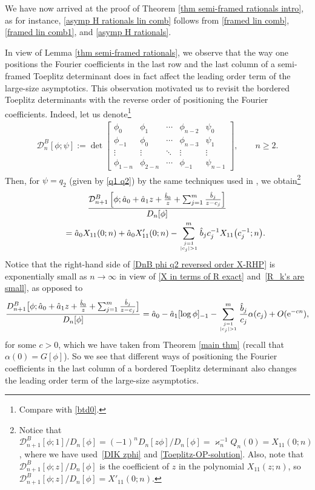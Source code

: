 \documentclass[10pt,a4paper]{amsart}
\numberwithin{equation}{section}
\newcommand{\al}{\alpha}
\begin{document}
We have now arrived at the proof of Theorem \ref{thm semi-framed rationals intro}, as for instance, \eqref{asymp H rationals lin comb} follows from \eqref{framed lin comb}, \eqref{framed lin comb1}, and \eqref{asymp H rationals}.
		
\begin{Remark}
In view of Lemma \ref{thm semi-framed rationals}, we observe that the way one positions the Fourier coefficients in the last row and the last column of a semi-framed Toeplitz determinant does in fact affect the leading order term of the large-size asymptotics. This observation motivated us to revisit the bordered Toeplitz determinants with the reverse order of positioning the Fourier coefficients. Indeed, let us denote\footnote{Compare with \eqref{btd0}.}
			\begin{gather*}%
				\mathcal{D}^{B}_{n}[\phi; \psi] := \det \begin{bmatrix}
					\phi_0& \phi_1 & \cdots & \phi_{n-2} & \psi_{0} \\
					\phi_{-1}& \phi_0 & \cdots & \phi_{n-3}&\psi_{1} \\
					\vdots & \vdots & \ddots & \vdots & \vdots\\
					\phi_{1-n} & \phi_{2-n} & \cdots & \phi_{-1}& \psi_{n-1}
				\end{bmatrix}, \qquad n \geq 2.
			\end{gather*}
			Then, for $\psi=q_2$ (given by \eqref{q1 q2}) by the same techniques used in \cite{BEGIL}, we obtain\footnote{Notice that $\mathcal{D}^{B}_{n+1}[\phi; 1]/D_n[\phi]=(-1)^{n}D_{n}[z\phi]/D_n[\phi] = \varkappa^{-1}_{n} Q_n(0) = X_{11}(0;n)$, where we have used~\eqref{DIK zphi} and \eqref{Toeplitz-OP-solution}. Also, note that $\mathcal{D}^{B}_{n+1}[\phi; z]/D_n[\phi]$ is the coefficient of $z$ in the polynomial $X_{11}(z;n)$, so $\mathcal{D}^{B}_{n+1}[\phi; z]/D_n[\phi] = X'_{11}(0;n)$.}
			\begin{gather}
				\frac{\mathcal{D}^{B}_{n+1}\left[\phi; \hat{a}_0+\hat{a}_1z+\tfrac{\hat{b}_0}{z}+	\sum_{j=1}^m \tfrac{\hat{b}_j}{z-c_j}\right]}{D_n[\phi]}\nonumber\\
\qquad = \hat{a}_0 X_{11}(0;n) + \hat{a}_0 X'_{11}(0;n) - \sum_{j=1 \atop |c_j|>1}^{m} \hat{b}_j c^{-1}_j X_{11}\big(c^{-1}_j;n\big).\label{DnB phi q2 reversed order X-RHP}
			\end{gather}
			Notice that the right-hand side of \eqref{DnB phi q2 reversed order X-RHP} is exponentially small as $n \to \infty$ in view of \eqref{X in terms of R exact} and~\eqref{R_k's are small}, as opposed to
			\begin{gather*}
				\frac{D^{B}_{n+1}\big[\phi; \hat{a}_0+\hat{a}_1z+\tfrac{\hat{b}_0}{z}+\sum_{j=1}^m \tfrac{\hat{b}_j}{z-c_j}\big]}{D_n[\phi]} = 			
				\hat{a}_0-\hat{a}_1[\log \phi]_{-1} -
				 \sum^{m}_{j=1 \atop |c_j|>1 } \frac{\hat{b}_j}{c_j} \al(c_j) + O({\rm e}^{-cn}),
			\end{gather*}
			for some $c>0$, which we have taken from Theorem \ref{main thm} (recall that $\al(0)=G[\phi]$). 	So we see that different ways of positioning the Fourier coefficients in the last column of a bordered Toeplitz determinant also changes the leading order term of the large-size asymptotics.
		\end{Remark}
		
\end{document}
